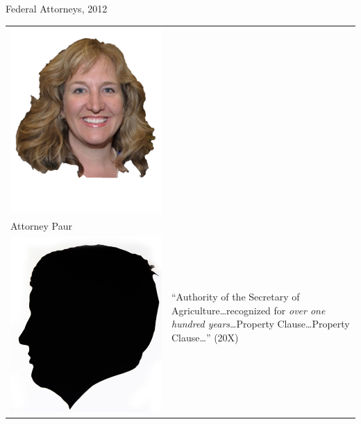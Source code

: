 \begin{frame}{Federal Attorneys, 2012}
\begin{table}[h]
\begin{tabular}{p{} p{}}
        { \includegraphics[height=0.15\textheight]{img/amanda-marshall.png} } & \\
    { \tiny Attorney Paur } & 
        \multirow{2}{.7\textwidth}{``Authority of the Secretary of Agriculture\ldots recognized for \emph{over one hundred years}\ldots Property Clause\ldots Property Clause\ldots'' (20X)} \\
        { \includegraphics[height=0.15\textheight]{img/elmer-dickens.png} } & \\

\end{tabular}
\end{table}
\end{frame}
